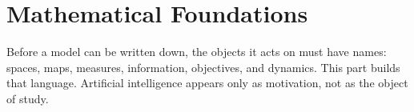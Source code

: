 \part{Mathematical Foundations}
\label{part:foundations}

Before a model can be written down, the objects it acts on must have names: spaces, maps, measures, information, objectives, and dynamics. This part builds that language. Artificial intelligence appears only as motivation, not as the object of study.
